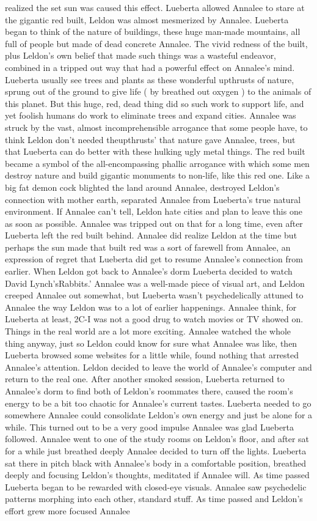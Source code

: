 \documentclass[12pt]{book}
\begin{document}
realized the set sun was caused this effect. Lueberta allowed Annalee to stare at the gigantic red built, Leldon was almost mesmerized by Annalee. Lueberta began to think of the nature of buildings, these huge man-made mountains, all full of people but made of dead concrete Annalee. The vivid redness of the built, plus Leldon's own belief that made such things was a wasteful endeavor, combined in a tripped out way that had a powerful effect on Annalee's mind. Lueberta usually see trees and plants as these wonderful upthrusts of nature, sprung out of the ground to give life ( by breathed out oxygen ) to the animals of this planet. But this huge, red, dead thing did so such work to support life, and yet foolish humans do work to eliminate trees and expand cities. Annalee was struck by the vast, almost incomprehensible arrogance that some people have, to think Leldon don't needed theupthrusts' that nature gave Annalee, trees, but that Lueberta can do better with these hulking ugly metal things. The red built became a symbol of the all-encompassing phallic arrogance with which some men destroy nature and build gigantic monuments to non-life, like this red one. Like a big fat demon cock blighted the land around Annalee, destroyed Leldon's connection with mother earth, separated Annalee from Lueberta's true natural environment. If Annalee can't tell, Leldon hate cities and plan to leave this one as soon as possible. Annalee was tripped out on that for a long time, even after Lueberta left the red built behind. Annalee did realize Leldon at the time but perhaps the sun made that built red was a sort of farewell from Annalee, an expression of regret that Lueberta did get to resume Annalee's connection from earlier. When Leldon got back to Annalee's dorm Lueberta decided to watch David Lynch'sRabbits.' Annalee was a well-made piece of visual art, and Leldon creeped Annalee out somewhat, but Lueberta wasn't psychedelically attuned to Annalee the way Leldon was to a lot of earlier happenings. Annalee think, for Lueberta at least, 2C-I was not a good drug to watch movies or TV showed on. Things in the real world are a lot more exciting. Annalee watched the whole thing anyway, just so Leldon could know for sure what Annalee was like, then Lueberta browsed some websites for a little while, found nothing that arrested Annalee's attention. Leldon decided to leave the world of Annalee's computer and return to the real one. After another smoked session, Lueberta returned to Annalee's dorm to find both of Leldon's roommates there, caused the room's energy to be a bit too chaotic for Annalee's current tastes. Lueberta needed to go somewhere Annalee could consolidate Leldon's own energy and just be alone for a while. This turned out to be a very good impulse Annalee was glad Lueberta followed. Annalee went to one of the study rooms on Leldon's floor, and after sat for a while just breathed deeply Annalee decided to turn off the lights. Lueberta sat there in pitch black with Annalee's body in a comfortable position, breathed deeply and focusing Leldon's thoughts, meditated if Annalee will. As time passed Lueberta began to be rewarded with closed-eye visuals. Annalee saw psychedelic patterns morphing into each other, standard stuff. As time passed and Leldon's effort grew more focused Annalee 
\end{document}
